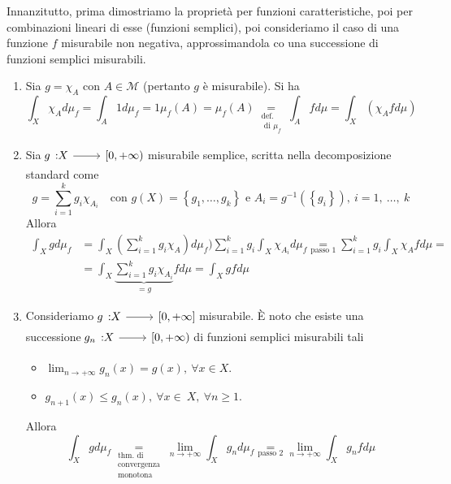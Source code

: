 \begin{demonstration}
	Innanzitutto, prima dimostriamo la proprietà per funzioni caratteristiche, poi per combinazioni lineari di esse (funzioni semplici), poi consideriamo il caso di una funzione $f$ misurabile non negativa, approssimandola co una successione di funzioni semplici misurabili.\\
	\begin{enumerate}[label=\Roman*]
		\item Sia $g=\chi_A$ con $A\in\mathcal{M}$ (pertanto $g$ è misurabile). Si ha
		\begin{equation*}
			\int_X\chi_Ad\mu_f=\int_A 1d\mu_f=1\mu_f\left(A\right)=\mu_f\left(A\right)\underset{\substack{\text{def.}\\\text{ di }\mu_f}}{=}\int_Afd\mu=\int_X\left(\chi_Afd\mu\right)
		\end{equation*}
		\item Sia $\funz{g}{X}{\left[0,+\infty\right)}$ misurabile semplice, scritta nella decomposizione standard come
		\begin{equation*}
			g=\sum_{i=1}^kg_i\chi_{A_i}\quad\text{con }g(X)=\left\{g_1,\ldots,g_k\right\}\text{ e }A_i=g^{-1}\left(\left\{g_i\right\}\right),\ i=1,\ \ldots,\ k
		\end{equation*}
	Allora
	\begin{align*}
			\int_Xgd\mu_f&=\int_X\left(\sum_{i=1}^kg_i\chi_A\right)d\mu_f)\sum_{i=1}^{k}g_i\int_X\chi_{A_i}d\mu_f\underset{\text{passo }1}{=}\sum_{i=1}^{k}g_i\int_X\chi_Afd\mu=\\
			&=\int_X\underbrace{\sum_{i=1}^{k}g_i\chi_{A_i}}_{=g}fd\mu=\int_Xgfd\mu
	\end{align*}
	\item Consideriamo $\funz{g}{X}{\left[0,+\infty\right]}$ misurabile. È noto che esiste una successione $\funz{g_n}{X}{\left[0,+\infty\right)}$ di funzioni semplici misurabili tali
	\begin{itemize}
		\item $\displaystyle\lim_{n\to+\infty}g_n(x)=g(x),\ \forall x\in X$.
		\item $g_{n+1}(x)\leq g_n(x),\ \forall x\in\ X,\ \forall n\geq 1$.
	\end{itemize}
Allora
	\begin{equation*}
	\int_Xgd\mu_f\underset{\substack{\text{thm. di}\\\text{convergenza}\\\text{monotona}}}{=}\lim_{n\to+\infty}\int_Xg_nd\mu_f\underset{\text{passo }2}{=}\lim_{n\to+\infty}\int_Xg_nfd\mu

\end{equation*}
\end{enumerate}
\end{demonstration}
